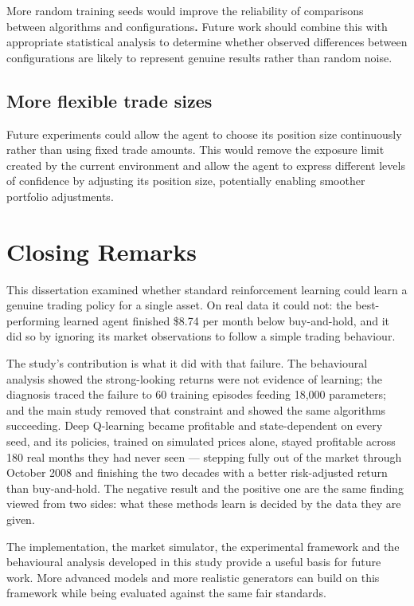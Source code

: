 More random training seeds would improve the reliability of comparisons~\cite{henderson2018}
between algorithms and configurations\textbf{.} Future work should
combine this with appropriate statistical analysis to determine whether
observed differences between configurations are likely to represent
genuine results rather than random noise.

\subsection{More flexible trade sizes}

Future experiments could allow the agent to choose its position size
continuously rather than using fixed trade amounts. This would remove
the exposure limit created by the current environment and allow the
agent to express different levels of confidence by adjusting its
position size, potentially enabling smoother portfolio adjustments.

\section{Closing Remarks}

This dissertation examined whether standard reinforcement learning could
learn a genuine trading policy for a single asset. On real data it could
not: the best-performing learned agent finished \$8.74 per month below
buy-and-hold, and it did so by ignoring its market observations to
follow a simple trading behaviour.

The study's contribution is what it did with that failure. The
behavioural analysis showed the strong-looking returns were not evidence
of learning; the diagnosis traced the failure to 60 training episodes
feeding 18,000 parameters; and the main study removed that constraint
and showed the same algorithms succeeding. Deep Q-learning became
profitable and state-dependent on every seed, and its policies, trained
on simulated prices alone, stayed profitable across 180 real months they
had never seen --- stepping fully out of the market through October
2008 and finishing the two decades with a better risk-adjusted return
than buy-and-hold. The negative result and the positive one are the same
finding viewed from two sides: what these methods learn is decided by
the data they are given.

The implementation, the market simulator, the experimental framework and
the behavioural analysis developed in this study provide a useful basis
for future work. More advanced models and more realistic generators can build on
this framework while being evaluated against the same fair standards.
